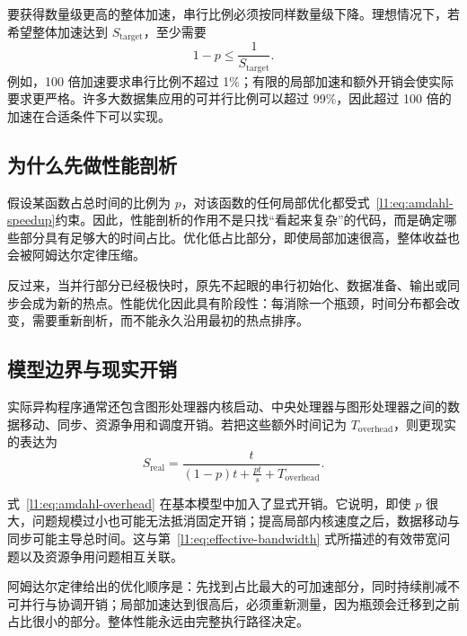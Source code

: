要获得数量级更高的整体加速，串行比例必须按同样数量级下降。理想情况下，若希望整体加速达到 $S_{\mathrm{target}}$，至少需要
\begin{equation*}
  1-p\le \frac{1}{S_{\mathrm{target}}}.
\end{equation*}
例如，100 倍加速要求串行比例不超过 1\%；有限的局部加速和额外开销会使实际要求更严格。许多大数据集应用的可并行比例可以超过 99\%，因此超过 100 倍的加速在合适条件下可以实现。

\subsection{为什么先做性能剖析}

假设某函数占总时间的比例为 $p$，对该函数的任何局部优化都受式~\eqref{l1:eq:amdahl-speedup}约束。因此，性能剖析的作用不是只找“看起来复杂”的代码，而是确定哪些部分具有足够大的时间占比。优化低占比部分，即使局部加速很高，整体收益也会被阿姆达尔定律压缩。

反过来，当并行部分已经极快时，原先不起眼的串行初始化、数据准备、输出或同步会成为新的热点。性能优化因此具有阶段性：每消除一个瓶颈，时间分布都会改变，需要重新剖析，而不能永久沿用最初的热点排序。

\subsection{模型边界与现实开销}

实际异构程序通常还包含图形处理器内核启动、中央处理器与图形处理器之间的数据移动、同步、资源争用和调度开销。若把这些额外时间记为 $T_{\mathrm{overhead}}$，则更现实的表达为
\begin{equation}
  S_{\mathrm{real}}
  =\frac{t}{(1-p)t+\frac{pt}{s}+T_{\mathrm{overhead}}}.
  \label{l1:eq:amdahl-overhead}
\end{equation}

式~\eqref{l1:eq:amdahl-overhead} 在基本模型中加入了显式开销。它说明，即使 $p$ 很大，问题规模过小也可能无法抵消固定开销；提高局部内核速度之后，数据移动与同步可能主导总时间。这与第~\ref{l1:eq:effective-bandwidth} 式所描述的有效带宽问题以及资源争用问题相互关联。

\begin{keybox}
阿姆达尔定律给出的优化顺序是：先找到占比最大的可加速部分，同时持续削减不可并行与协调开销；局部加速达到很高后，必须重新测量，因为瓶颈会迁移到之前占比很小的部分。整体性能永远由完整执行路径决定。
\end{keybox}
